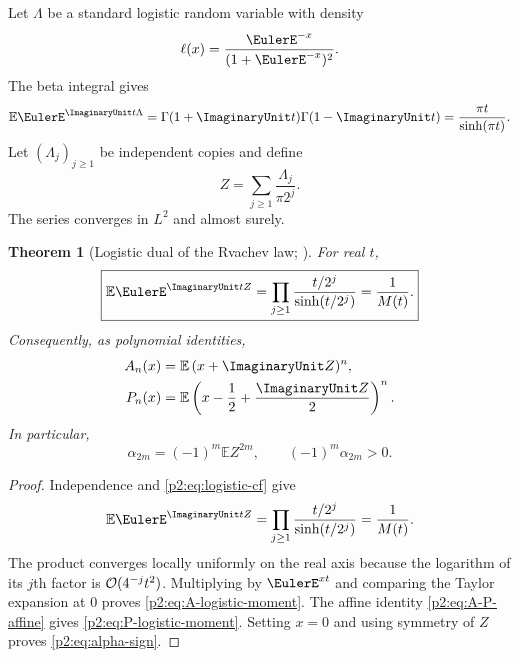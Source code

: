 \documentclass[11pt,oneside]{article}
\numberwithin{equation}{section}
\newtheorem{theorem}{Theorem}[section]
\theoremstyle{definition}
\theoremstyle{remark}
\begin{document}
Let $\Lambda$ be a standard logistic random variable with density
\begin{equation}
 \ell(x)=\frac{\EulerE^{-x}}{(1+\EulerE^{-x})^2}.
 \label{p2:eq:logistic-density}
\end{equation}
The beta integral gives
\begin{equation}
 \mathbb E\EulerE^{\ImaginaryUnit t\Lambda}
 =\Gamma(1+\ImaginaryUnit t)\Gamma(1-\ImaginaryUnit t)
 =\frac{\pi t}{\sinh(\pi t)}.
 \label{p2:eq:logistic-cf}
\end{equation}
Let $(\Lambda_j)_{j\ge1}$ be independent copies and define
\begin{equation}
 Z=\sum_{j\ge1}\frac{\Lambda_j}{\pi2^j}.
 \label{p2:eq:Z-logistic}
\end{equation}
The series converges in $L^2$ and almost surely.

\begin{theorem}[Logistic dual of the Rvachev law; \statusnew]
\label{p2:thm:logistic-dual}
For real $t$,
\begin{equation}
 \boxed{
 \mathbb E\EulerE^{\ImaginaryUnit tZ}
 =\prod_{j\ge1}\frac{t/2^j}{\sinh(t/2^j)}
 =\frac1{M(t)}.
 }
 \label{p2:eq:Z-cf}
\end{equation}
Consequently, as polynomial identities,
\begin{align}
 A_n(x)&=\mathbb E\,(x+\ImaginaryUnit Z)^n,
 \label{p2:eq:A-logistic-moment}\\
 P_n(x)&=\mathbb E\left(x-\frac12+\frac{\ImaginaryUnit Z}{2}\right)^n.
 \label{p2:eq:P-logistic-moment}
\end{align}
In particular,
\begin{equation}
 \boxed{
 \alpha_{2m}=(-1)^m\mathbb E Z^{2m},
 \qquad (-1)^m\alpha_{2m}>0.
 }
 \label{p2:eq:alpha-sign}
\end{equation}
\end{theorem}

\begin{proof}
Independence and \eqref{p2:eq:logistic-cf} give
\[
 \mathbb E\EulerE^{\ImaginaryUnit tZ}
 =\prod_{j\ge1}
 \frac{t/2^j}{\sinh(t/2^j)}=\frac1{M(t)}.
\]
The product converges locally uniformly on the real axis because the logarithm of its $j$th factor
is $\mathcal O(4^{-j}t^2)$.  Multiplying by $\EulerE^{xt}$ and comparing the Taylor expansion at $0$ proves
\eqref{p2:eq:A-logistic-moment}.  The affine identity \eqref{p2:eq:A-P-affine} gives
\eqref{p2:eq:P-logistic-moment}.  Setting $x=0$ and using symmetry of $Z$ proves
\eqref{p2:eq:alpha-sign}.
\end{proof}
\end{document}
